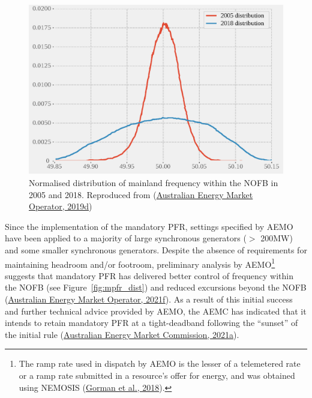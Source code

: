 \documentclass[12pt,a4paper,]{report}
\begin{document}
\begin{figure}
\hypertarget{fig:nofb_freq_2005_2018}{%
\centering
\includegraphics{source/figures/nem_nofb_frequency_2005_2018_digitised.eps}
\caption[NEM mainland frequency distributions, 2005 and 2018]{Normalised
distribution of mainland frequency within the NOFB in 2005 and 2018.
Reproduced from
(\protect\hyperlink{ref-australianenergymarketoperatorElectricityRuleChange2019a}{Australian
Energy Market Operator, 2019d})}\label{fig:nofb_freq_2005_2018}
}
\end{figure}

Since the implementation of the mandatory PFR, settings specified by
AEMO have been applied to a majority of large synchronous generators
(\(>\) 200MW) and some smaller synchronous generators. Despite the
absence of requirements for maintaining headroom and/or footroom,
preliminary analysis by AEMO\footnote{The ramp rate used in dispatch by
  AEMO is the lesser of a telemetered rate or a ramp rate submitted in a
  resource's offer for energy, and was obtained using NEMOSIS
  (\protect\hyperlink{ref-gormanNEMOSISNEMOpen2018}{Gorman et al.,
  2018}).} suggests that mandatory PFR has delivered better control of
frequency within the NOFB (see Figure~\ref{fig:mpfr_dist}) and reduced
excursions beyond the NOFB
(\protect\hyperlink{ref-australianenergymarketoperatorEnduringPrimaryFrequency2021}{Australian
Energy Market Operator, 2021f}). As a result of this initial success and
further technical advice provided by AEMO, the AEMC has indicated that
it intends to retain mandatory PFR at a tight-deadband following the
``sunset'' of the initial rule
(\protect\hyperlink{ref-australianenergymarketcommissionPrimaryFrequencyResponse2021}{Australian
Energy Market Commission, 2021a}).
\end{document}
